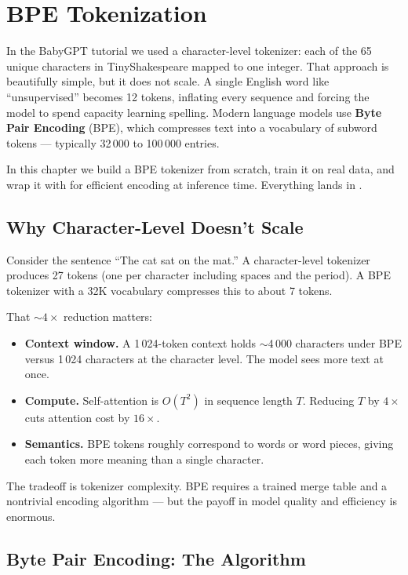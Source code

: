 \chapter{BPE Tokenization}
\label{ch:bpe}

In the BabyGPT tutorial we used a character-level tokenizer: each of the 65 unique characters in TinyShakespeare mapped to one integer.  That approach is beautifully simple, but it does not scale.  A single English word like ``unsupervised'' becomes 12 tokens, inflating every sequence and forcing the model to spend capacity learning spelling.  Modern language models use \textbf{Byte Pair Encoding} (BPE), which compresses text into a vocabulary of subword tokens --- typically 32\,000 to 100\,000 entries.

In this chapter we build a BPE tokenizer from scratch, train it on real data, and wrap it with  for efficient encoding at inference time.  Everything lands in .


\section{Why Character-Level Doesn't Scale}

Consider the sentence ``The cat sat on the mat.''  A character-level tokenizer produces 27 tokens (one per character including spaces and the period).  A BPE tokenizer with a 32K vocabulary compresses this to about 7 tokens.

That ${\sim}4\times$ reduction matters:
\begin{itemize}
  \item \textbf{Context window.}  A 1\,024-token context holds $\sim$4\,000 characters under BPE versus 1\,024 characters at the character level.  The model sees more text at once.
  \item \textbf{Compute.}  Self-attention is $O(T^2)$ in sequence length $T$.  Reducing $T$ by $4\times$ cuts attention cost by $16\times$.
  \item \textbf{Semantics.}  BPE tokens roughly correspond to words or word pieces, giving each token more meaning than a single character.
\end{itemize}

The tradeoff is tokenizer complexity.  BPE requires a trained merge table and a nontrivial encoding algorithm --- but the payoff in model quality and efficiency is enormous.


\section{Byte Pair Encoding: The Algorithm}

